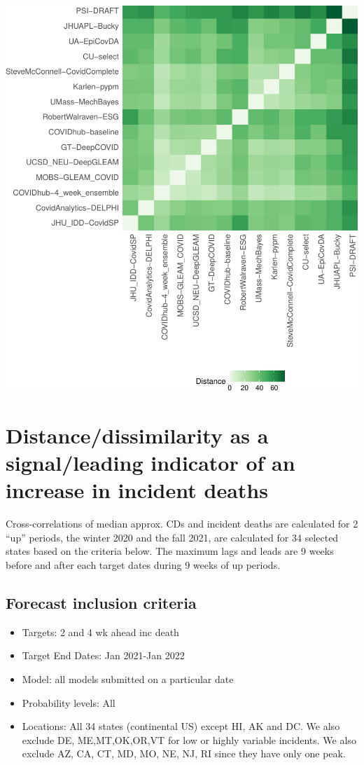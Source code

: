 \documentclass[
]{article}
\providecommand{\tightlist}{%
  \setlength{\itemsep}{0pt}\setlength{\parskip}{0pt}}
\begin{document}
\includegraphics{sim_analysis_4_files/figure-latex/unnamed-chunk-3-1.pdf}

\hypertarget{distancedissimilarity-as-a-signalleading-indicator-of-an-increase-in-incident-deaths}{%
\section{Distance/dissimilarity as a signal/leading indicator of an
increase in incident
deaths}\label{distancedissimilarity-as-a-signalleading-indicator-of-an-increase-in-incident-deaths}}

Cross-correlations of median approx. CDs and incident deaths are
calculated for 2 ``up'' periods, the winter 2020 and the fall 2021, are
calculated for 34 selected states based on the criteria below. The
maximum lags and leads are 9 weeks before and after each target dates
during 9 weeks of up periods.

\hypertarget{forecast-inclusion-criteria}{%
\subsection{Forecast inclusion
criteria}\label{forecast-inclusion-criteria}}

\begin{itemize}
\tightlist
\item
  Targets: 2 and 4 wk ahead inc death
\item
  Target End Dates: Jan 2021-Jan 2022
\item
  Model: all models submitted on a particular date
\item
  Probability levels: All
\item
  Locations: All 34 states (continental US) except HI, AK and DC. We
  also exclude DE, ME,MT,OK,OR,VT for low or highly variable incidents.
  We also exclude AZ, CA, CT, MD, MO, NE, NJ, RI since they have only
  one peak.
\end{itemize}
\end{document}

